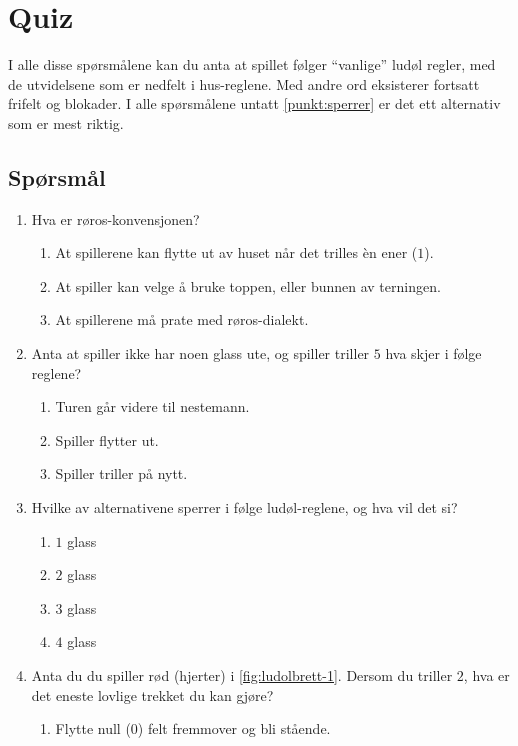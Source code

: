 \documentclass[10pt,a4paper,norsk,openany]{book}
\begin{document}
\chapter{Quiz}
\label{chap:quiz}
I alle disse spørsmålene kan du anta at spillet følger ``vanlige'' ludøl
regler, med de utvidelsene som er nedfelt i hus-reglene. Med andre ord
eksisterer fortsatt frifelt og blokader. I alle spørsmålene untatt
\cref{punkt:sperrer} er det ett alternativ som er mest riktig.  

\section{Spørsmål}

\begin{enumerate}
  \item Hva er røros-konvensjonen? 
    \begin{enumerate}
      \item At spillerene kan flytte ut av huset når det trilles èn ener ($1$).
      \item At spiller kan velge å bruke toppen, eller bunnen av terningen.
      \item At spillerene må prate med røros-dialekt.
    \end{enumerate}
  \item Anta at spiller ikke har noen glass ute, og spiller triller $5$ hva
    skjer i følge reglene? 
    \begin{enumerate}
    \item Turen går videre til nestemann.
    \item Spiller flytter ut.
    \item Spiller triller på nytt. 
    \end{enumerate}
  \item \label{punkt:sperrer} Hvilke av alternativene sperrer i følge ludøl-reglene, og hva vil
    det si?
    \begin{enumerate}
      \item $1$ glass
      \item $2$ glass
      \item $3$ glass
      \item $4$ glass
    \end{enumerate}
  \item Anta du du spiller rød (hjerter) i \cref{fig:ludolbrett-1}. Dersom du
    triller $2$, hva er det eneste lovlige trekket du kan gjøre?
    \begin{enumerate}
      \item Flytte null ($0$) felt fremmover og bli stående.

\end{enumerate}
\end{enumerate}
\end{document}
